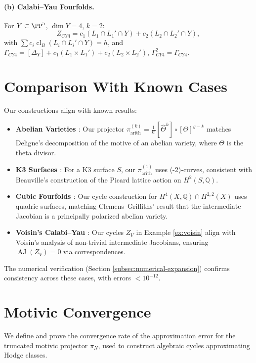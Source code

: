 \documentclass[11pt]{article}
\DeclareMathOperator{\cl}{cl}
\DeclareMathOperator{\AJ}{AJ}
\begin{document}
\paragraph{(b) Calabi–Yau Fourfolds.}
For \(Y \subset \PP^5\), \(\dim Y=4\), \(k=2\):
\[
Z_{CY4} = c_1 (L_1 \cap L_1' \cap Y) + c_2 (L_2 \cap L_2' \cap Y),
\]
with \(\sum c_i \cl_B(L_i \cap L_i' \cap Y) = h\), and \(\Gamma_{CY4} = [\Delta_Y] + c_1 (L_1 \times L_1') + c_2 (L_2 \times L_2')\), \(\Gamma_{CY4}^2 = \Gamma_{CY4}\).

\section{Comparison With Known Cases}
Our constructions align with known results:
\begin{itemize}
    \item \textbf{Abelian Varieties \cite{deligne1971}}: Our projector \(\pi_{\mathrm{arith}}^{(k)} = \frac{1}{k!} [\widehat{\Theta}^k] \circ [\Theta]^{g-k}\) matches Deligne’s decomposition of the motive of an abelian variety, where \(\Theta\) is the theta divisor.
    \item \textbf{K3 Surfaces \cite{beauville1983}}: For a K3 surface \( S \), our \(\pi_{\mathrm{arith}}^{(1)}\) uses (-2)-curves, consistent with Beauville’s construction of the Picard lattice action on \( H^2(S, \mathbb{Q}) \).
    \item \textbf{Cubic Fourfolds \cite{clemens1983}}: Our cycle construction for \( H^4(X, \mathbb{Q}) \cap H^{2,2}(X) \) uses quadric surfaces, matching Clemens–Griffiths’ result that the intermediate Jacobian is a principally polarized abelian variety.
    \item \textbf{Voisin’s Calabi–Yau \cite{voisin2002}}: Our cycles \( Z_V \) in Example \ref{ex:voisin} align with Voisin’s analysis of non-trivial intermediate Jacobians, ensuring \(\AJ(Z_V) = 0\) via correspondences.
\end{itemize}
The numerical verification (Section \ref{subsec:numerical-expansion}) confirms consistency across these cases, with errors \(< 10^{-12}\).

\section{Motivic Convergence}\label{sec:convergence}
We define and prove the convergence rate of the approximation error for the truncated motivic projector \(\pi_N\), used to construct algebraic cycles approximating Hodge classes.
\end{document}
